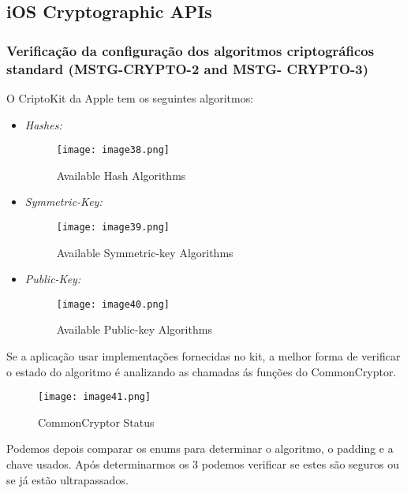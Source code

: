 \subsection{iOS Cryptographic APIs}

\hfill\par

\subsubsection{Verificação da configuração dos algoritmos criptográficos standard (MSTG-CRYPTO-2 and MSTG- CRYPTO-3)}
\hfill\par
\hfill\par

O CriptoKit da Apple tem os seguintes algoritmos:
\begin{itemize}
\item \textit{Hashes:}

\begin{figure}[H]
\centering
\texttt{[image: image38.png]}
\caption {Available Hash Algorithms}
\label {fig02}
\end{figure}

\item \textit{Symmetric-Key:}

\begin{figure}[H]
\centering
\texttt{[image: image39.png]}
\caption {Available Symmetric-key Algorithms}
\label {fig02}
\end{figure}
\item \textit{Public-Key:}

\begin{figure}[H]
\centering
\texttt{[image: image40.png]}
\caption {Available Public-key Algorithms}
\label {fig02}
\end{figure}
\end{itemize}

Se a aplicação usar implementações fornecidas no kit, a melhor forma de verificar o estado do algoritmo é analizando as chamadas ás funções do CommonCryptor. 

\begin{figure}[H]
\centering
\texttt{[image: image41.png]}
\caption {CommonCryptor Status}
\label {fig02}
\end{figure}

Podemos depois comparar os enums para determinar o algoritmo, o padding e a chave usados.
Após determinarmos os 3 podemos verificar se estes são seguros ou se já estão ultrapassados.



